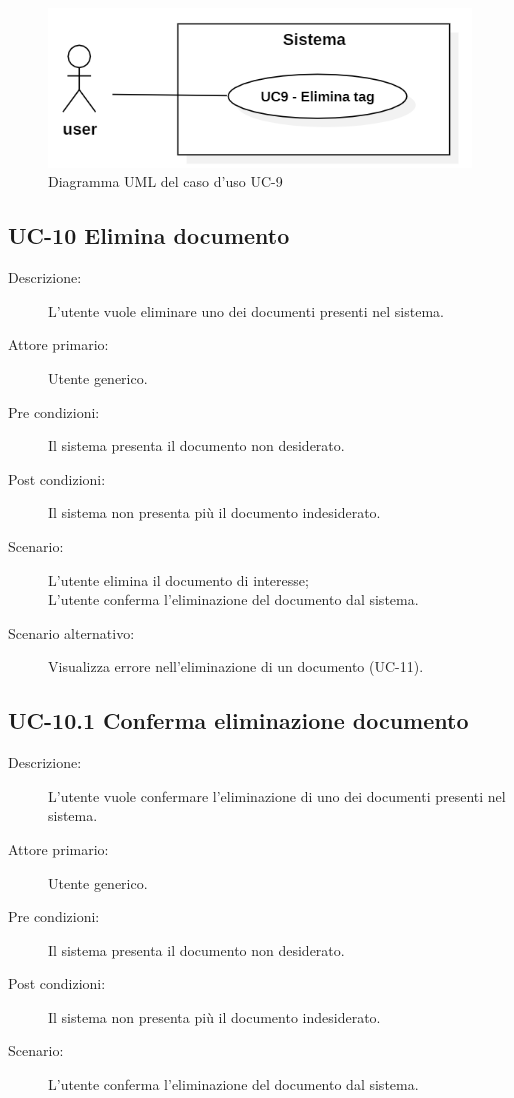 \begin{figure}[H]
    \centering
    \includegraphics[width=0.8\linewidth]{UC9.PNG}
    \caption{Diagramma UML del caso d'uso UC-9}
    \label{fig:UC9}
\end{figure}

\subsection{UC-10 Elimina documento}
\begin{description}
    \item[Descrizione:] L'utente vuole eliminare uno dei documenti presenti nel sistema.
    \item[Attore primario:] Utente generico.
    \item[Pre condizioni:] Il sistema presenta il documento non desiderato.
    \item[Post condizioni:] Il sistema non presenta più il documento indesiderato.
    \item[Scenario:] L'utente elimina il documento di interesse;\\L'utente conferma l'eliminazione del documento dal sistema.
    \item[Scenario alternativo:] Visualizza errore nell'eliminazione di un documento (UC-11).
\end{description}

\subsection{UC-10.1 Conferma eliminazione documento}
\begin{description}
    \item[Descrizione:] L'utente vuole confermare l'eliminazione di uno dei documenti presenti nel sistema.
    \item[Attore primario:] Utente generico.
    \item[Pre condizioni:] Il sistema presenta il documento non desiderato.
    \item[Post condizioni:] Il sistema non presenta più il documento indesiderato.
    \item[Scenario:] L'utente conferma l'eliminazione del documento dal sistema.
\end{description}


